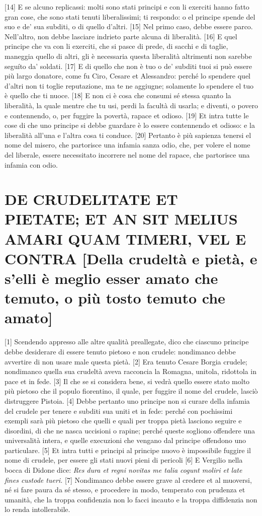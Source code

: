 \break

{[}14{]} E se alcuno replicassi: molti sono stati principi e con li
exerciti hanno fatto gran cose, che sono stati tenuti liberalissimi; ti
respondo: o el principe spende del suo e de' sua subditi, o di quello
d'altri. {[}15{]} Nel primo caso, debbe essere parco. Nell'altro, non
debbe lasciare indrieto parte alcuna di liberalità. {[}16{]} E quel
principe che va con li exerciti, che si pasce di prede, di sacchi e di
taglie, maneggia quello di altri, gli è necessaria questa liberalità
altrimenti non sarebbe seguíto da' soldati. {[}17{]} E di quello che non
è tuo o de' subditi tuoi si può essere più largo donatore, come fu Ciro,
Cesare et Alessandro: perché lo spendere quel d'altri non ti toglie
reputazione, ma te ne aggiugne; solamente lo spendere el tuo è quello
che ti nuoce. {[}18{]} E non ci è cosa che consumi sé stessa quanto la
liberalità, la quale mentre che tu usi, perdi la facultà di usarla; e
diventi, o povero e contennendo, o, per fuggire la povertà, rapace et
odioso. {[}19{]} Et intra tutte le cose di che uno principe si debbe
guardare è lo essere contennendo et odioso: e la liberalità all'una e
l'altra cosa ti conduce. {[}20{]} Pertanto è più sapienza tenersi el
nome del misero, che partorisce una infamia sanza odio, che, per volere
el nome del liberale, essere necessitato incorrere nel nome del rapace,
che partorisce una infamia con odio.

\quebra\section{DE CRUDELITATE ET PIETATE; ET AN SIT MELIUS AMARI QUAM TIMERI, VEL E CONTRA\break
{[}Della crudeltà e pietà, e s'elli è meglio esser amato che temuto, o
più tosto temuto che amato{]}}

{[}1{]} Scendendo appresso alle altre qualità preallegate, dico che
ciascuno principe debbe desiderare di essere tenuto pietoso e non
crudele: nondimanco debbe avvertire di non usare male questa pietà.
{[}2{]} Era tenuto Cesare Borgia crudele; nondimanco quella sua crudeltà
aveva racconcia la Romagna, unitola, ridottola in pace et in fede.
{[}3{]} Il che se si considera bene, si vedrà quello essere stato molto
più pietoso che il populo fiorentino, il quale, per fuggire il nome del
crudele, lasciò distruggere Pistoia. {[}4{]} Debbe pertanto uno principe
non si curare della infamia del crudele per tenere e subditi sua uniti
et in fede: perché con pochissimi exempli sarà più pietoso che quelli e
quali per troppa pietà lasciono seguire e disordini, di che ne nasca
uccisioni o rapine; perché queste sogliono offendere una universalità
intera, e quelle execuzioni che vengano dal principe offendono uno
particulare. {[}5{]} Et intra tutti e principi al principe nuovo è
impossibile fuggire il nome di crudele, per essere gli stati nuovi pieni
di pericoli {[}6{]} E Vergilio nella bocca di Didone dice: \emph{Res
dura et regni novitas me talia cogunt moliri et late fines custode
tueri.} {[}7{]} Nondimanco debbe essere grave al credere et al muoversi,
né si fare paura da sé stesso, e procedere in modo, temperato con
prudenza et umanità, che la troppa confidenzia non lo facci incauto e la
troppa diffidenzia non lo renda intollerabile.

